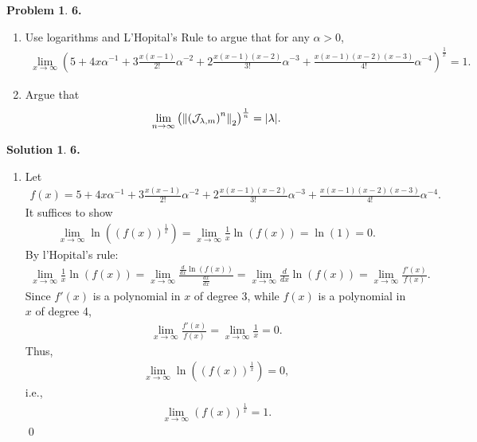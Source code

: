 \documentclass{book}
\theoremstyle{definition}
\newtheorem*{prob*}{Problem}
\newtheorem*{sln*}{Solution}
\newcommand{\jor}{\mathcal{J}}
\begin{document}
\newpage




\begin{prob*}\textbf{6. }\\
	\begin{enumerate}
		\item Use logarithms and L'Hopital's Rule to argue that for any $\alpha > 0$,
		\begin{align*}
		\lim\limits_{x\to \infty} \left(5 + 4x\alpha^{-1} + 3\frac{x(x-1)}{2!}\alpha^{-2}+ 2\frac{x(x-1)(x-2)}{3!}\alpha^{-3} + \frac{x(x-1)(x-2)(x-3)}{4!}\alpha^{-4}  \right)^{\frac{1}{x}} = 1.
		\end{align*}
		
		
		\item Argue that 
		\begin{align*}
		\lim\limits_{n\to\infty} \left(\norm{\left(\jor_{\lambda,m}\right)^n}_2\right)^{\frac{1}{n}} = \abs{\lambda}.
		\end{align*}
	\end{enumerate}


	\begin{sln*}\textbf{6.}
		$\,$\\
		\begin{enumerate}
			\item Let 
			\begin{align*}
			f(x) = 5 + 4x\alpha^{-1} + 3\frac{x(x-1)}{2!}\alpha^{-2}+ 2\frac{x(x-1)(x-2)}{3!}\alpha^{-3} + \frac{x(x-1)(x-2)(x-3)}{4!}\alpha^{-4}.
			\end{align*}
			It suffices to show 
			\begin{align*}
			\lim\limits_{x\to\infty}\ln\left( \left(f(x)\right)^\frac{1}{x}\right) = \lim\limits_{x\to\infty} \frac{1}{x}\ln(f(x)) = \ln(1) = 0.
			\end{align*}
			By l'Hopital's rule:
			\begin{align*}
			\lim\limits_{x\to\infty} \frac{1}{x}\ln(f(x)) = \lim\limits_{x\to\infty} \frac{\frac{d}{dx}\ln(f(x))}{\frac{dx}{dx}} =
			\lim\limits_{x\to\infty} \frac{d}{dx}\ln(f(x))
			= \lim\limits_{x\to\infty} \frac{f'(x)}{f(x)}.
			\end{align*}
			Since $f'(x)$ is a polynomial in $x$ of degree 3, while $f(x)$ is a polynomial in $x$ of degree 4, 
			\begin{align*}
			\lim\limits_{x\to\infty} \frac{f'(x)}{f(x)}= \lim\limits_{x\to\infty}\frac{1}{x} = 0.
			\end{align*}
			Thus, 
			\begin{align*}
			\lim\limits_{x\to\infty}\ln\left( \left(f(x)\right)^\frac{1}{x}\right) = 0,
			\end{align*}
			i.e.,
			\begin{align*}
			\lim\limits_{x\to\infty}\left(f(x)\right)^\frac{1}{x} = 1.
			\end{align*}\qed
			

\end{enumerate}
\end{sln*}
\end{prob*}
\end{document}
